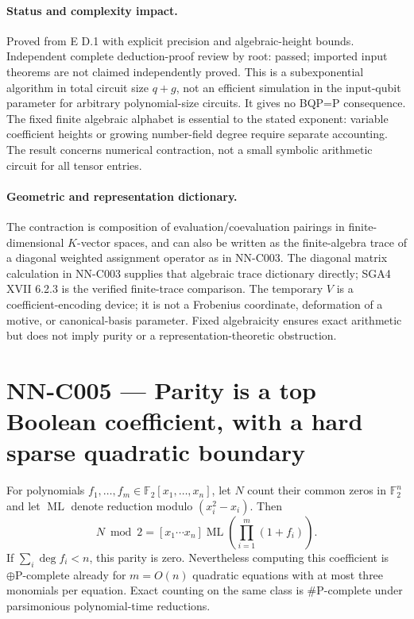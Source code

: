\paragraph{Status and complexity impact.}
Proved from E D.1 with explicit precision and algebraic-height bounds. Independent complete deduction-proof review by root: passed; imported input theorems are not claimed independently proved. This is a subexponential algorithm in total circuit size $q+g$, not an efficient simulation in the input-qubit parameter for arbitrary polynomial-size circuits. It gives no BQP=P consequence. The fixed finite algebraic alphabet is essential to the stated exponent: variable coefficient heights or growing number-field degree require separate accounting. The result concerns numerical contraction, not a small symbolic arithmetic circuit for all tensor entries.

\paragraph{Geometric and representation dictionary.}
The contraction is composition of evaluation/coevaluation pairings in finite-dimensional $K$-vector spaces, and can also be written as the finite-algebra trace of a diagonal weighted assignment operator as in NN-C003. The diagonal matrix calculation in NN-C003 supplies that algebraic trace dictionary directly; SGA4 XVII 6.2.3 is the verified finite-trace comparison. The temporary $V$ is a coefficient-encoding device; it is not a Frobenius coordinate, deformation of a motive, or canonical-basis parameter. Fixed algebraicity ensures exact arithmetic but does not imply purity or a representation-theoretic obstruction.



\section{NN-C005 --- Parity is a top Boolean coefficient, with a hard sparse quadratic boundary}
\begin{proposition}[NN-C005]
For polynomials $f_1,\ldots,f_m\in\mathbb F_2[x_1,\ldots,x_n]$, let $N$ count their common zeros in $\mathbb F_2^n$ and let $\operatorname{ML}$ denote reduction modulo $(x_i^2-x_i)$. Then
\[
 N\bmod2=[x_1\cdots x_n]\operatorname{ML}\!\left(\prod_{i=1}^m(1+f_i)\right).
\]
If $\sum_i\deg f_i<n$, this parity is zero. Nevertheless computing this coefficient is $\oplus\mathrm P$-complete already for $m=O(n)$ quadratic equations with at most three monomials per equation. Exact counting on the same class is $\#\mathrm P$-complete under parsimonious polynomial-time reductions.
\end{proposition}
